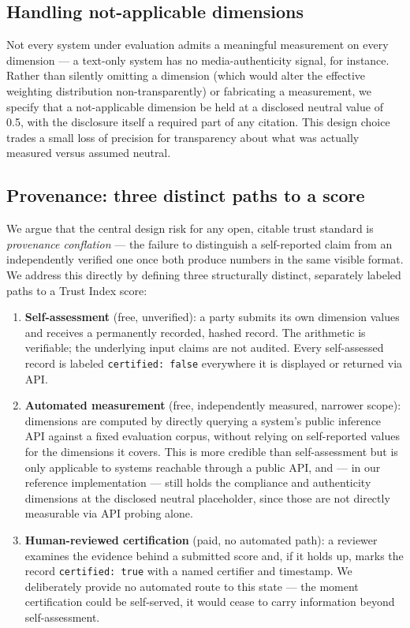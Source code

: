 \documentclass[11pt]{article}
\begin{document}
\subsection{Handling not-applicable dimensions}

Not every system under evaluation admits a meaningful measurement on
every dimension --- a text-only system has no media-authenticity
signal, for instance. Rather than silently omitting a dimension (which
would alter the effective weighting distribution non-transparently) or
fabricating a measurement, we specify that a not-applicable dimension
be held at a disclosed neutral value of 0.5, with the disclosure
itself a required part of any citation. This design choice trades a
small loss of precision for transparency about what was actually
measured versus assumed neutral.

\subsection{Provenance: three distinct paths to a score}

We argue that the central design risk for any open, citable trust
standard is \emph{provenance conflation} --- the failure to
distinguish a self-reported claim from an independently verified one
once both produce numbers in the same visible format. We address this
directly by defining three structurally distinct, separately labeled
paths to a Trust Index score:

\begin{enumerate}
\item \textbf{Self-assessment} (free, unverified): a party submits its
  own dimension values and receives a permanently recorded, hashed
  record. The arithmetic is verifiable; the underlying input claims
  are not audited. Every self-assessed record is labeled
  \texttt{certified: false} everywhere it is displayed or returned via
  API.
\item \textbf{Automated measurement} (free, independently measured,
  narrower scope): dimensions are computed by directly querying a
  system's public inference API against a fixed evaluation corpus,
  without relying on self-reported values for the dimensions it
  covers. This is more credible than self-assessment but is only
  applicable to systems reachable through a public API, and --- in our
  reference implementation --- still holds the compliance and
  authenticity dimensions at the disclosed neutral placeholder, since
  those are not directly measurable via API probing alone.
\item \textbf{Human-reviewed certification} (paid, no automated path):
  a reviewer examines the evidence behind a submitted score and, if it
  holds up, marks the record \texttt{certified: true} with a named
  certifier and timestamp. We deliberately provide no automated route
  to this state --- the moment certification could be self-served, it
  would cease to carry information beyond self-assessment.
\end{enumerate}
\end{document}
